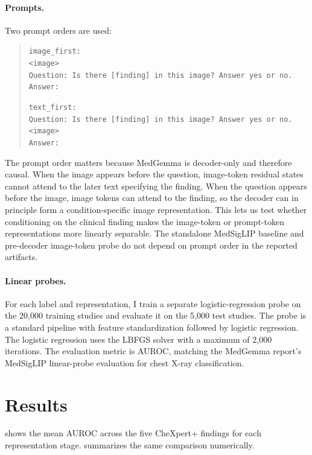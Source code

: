 \documentclass{article}
\begin{document}
\paragraph{Prompts.}
Two prompt orders are used:
\begin{quote}
\small
\texttt{image\_first:}\\
\texttt{\textless image\textgreater}\\
\texttt{Question: Is there [finding] in this image? Answer yes or no.}\\
\texttt{Answer:}

\texttt{text\_first:}\\
\texttt{Question: Is there [finding] in this image? Answer yes or no.}\\
\texttt{\textless image\textgreater}\\
\texttt{Answer:}
\end{quote}
The prompt order matters because MedGemma is decoder-only and therefore causal.
When the image appears before the question, image-token residual states cannot attend to the later text specifying the finding.
When the question appears before the image, image tokens can attend to the finding, so the decoder can in principle form a condition-specific image representation.
This lets us test whether conditioning on the clinical finding makes the image-token or prompt-token representations more linearly separable.
The standalone MedSigLIP baseline and pre-decoder image-token probe do not depend on prompt order in the reported artifacts.

\paragraph{Linear probes.}
For each label and representation, I train a separate logistic-regression probe on the 20,000 training studies and evaluate it on the 5,000 test studies.
The probe is a standard pipeline with feature standardization followed by logistic regression.
The logistic regression uses the LBFGS solver with a maximum of 2,000 iterations.
The evaluation metric is AUROC, matching the MedGemma report's MedSigLIP linear-probe evaluation for chest X-ray classification.

\section{Results}

 shows the mean AUROC across the five CheXpert+ findings for each representation stage.
 summarizes the same comparison numerically.
\end{document}
